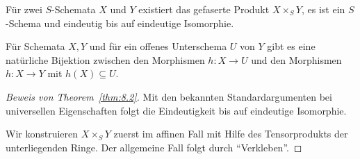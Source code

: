\begin{thm}
\label{thm:8.2}
	Für zwei $S$-Schemata $X$ und $Y$ existiert das gefaserte Produkt $X \times_S Y$, es ist ein $S$-Schema und eindeutig bis auf eindeutige Isomorphie.
\end{thm}

\begin{bem}
\label{bem:8.3}
	Für Schemata $X,Y$ und für ein offenes Unterschema $U$ von $Y$ gibt es eine natürliche Bijektion zwischen den Morphismen $h\colon X \to U$ und den Morphismen $h \colon X \to Y$ mit $h(X) \subseteq U$.
\end{bem}

\begin{proof}[Beweis von Theorem~\ref{thm:8.2}]
	Mit den bekannten Standardargumenten bei universellen Eigenschaften folgt die Eindeutigkeit bis auf eindeutige Isomorphie.

	Wir konstruieren $X \times_S Y$ zuerst im affinen Fall mit Hilfe des Tensorprodukts der unterliegenden Ringe. Der allgemeine Fall folgt durch \enquote{Verkleben}.


\end{proof}
